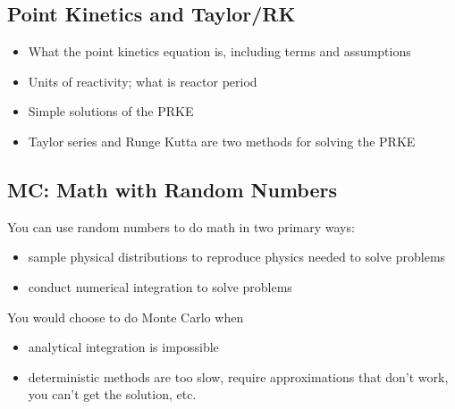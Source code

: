 \documentclass[12pt]{article}
\begin{document}
\subsection*{Point Kinetics and Taylor/RK}
\begin{itemize}
\item What the point kinetics equation is, including terms and assumptions
\item Units of reactivity; what is reactor period 
\item Simple solutions of the PRKE
\item Taylor series and Runge Kutta are two methods for solving the PRKE
\end{itemize}


\subsection*{MC: Math with Random Numbers}
You can use random numbers to do math in two primary ways: 
\begin{itemize}
\item sample physical distributions to reproduce physics needed to solve  problems
\item conduct numerical integration to solve problems
\end{itemize}

You would choose to do Monte Carlo when 
\begin{itemize}
\item analytical integration is impossible
\item deterministic methods are too slow, require approximations that don't work, you can't get the solution, etc.
\end{itemize} 
\end{document}
